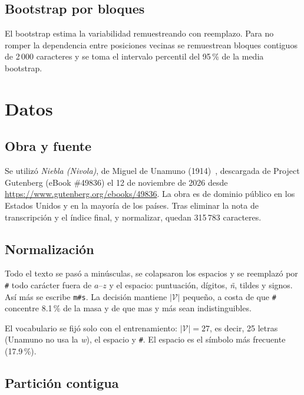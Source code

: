 \documentclass[11pt,letterpaper]{article}
\begin{document}
\subsection{Bootstrap por bloques}

El bootstrap estima la variabilidad remuestreando con reemplazo. Para no romper la dependencia entre posiciones vecinas se remuestrean bloques contiguos de 2\,000 caracteres y se toma el intervalo percentil del 95\,\% de la media bootstrap.

\section{Datos}\label{sec:datos}

\subsection{Obra y fuente}

Se utilizó \emph{Niebla (Nivola)}, de Miguel de Unamuno (1914)~\cite{unamuno}, descargada de Project Gutenberg (eBook \#49836) el 12 de noviembre de 2026 desde \url{https://www.gutenberg.org/ebooks/49836}. La obra es de dominio público en los Estados Unidos y en la mayoría de los países. Tras eliminar la nota de transcripción y el índice final, y normalizar, quedan 315\,783 caracteres.

\subsection{Normalización}

Todo el texto se pasó a minúsculas, se colapsaron los espacios y se reemplazó por \texttt{\#} todo carácter fuera de $a$--$z$ y el espacio: puntuación, dígitos, \emph{ñ}, tildes y signos. Así \guillemotleft{}más\guillemotright{} se escribe \texttt{m\#s}. La decisión mantiene $|\mathcal{V}|$ pequeño, a costa de que \texttt{\#} concentre 8.1\,\% de la masa y de que \guillemotleft{}mas\guillemotright{} y \guillemotleft{}más\guillemotright{} sean indistinguibles.

El vocabulario se fijó solo con el entrenamiento: $|\mathcal{V}|=27$, es decir, 25 letras (Unamuno no usa la \emph{w}), el espacio y \texttt{\#}. El espacio es el símbolo más frecuente (17.9\,\%).

\subsection{Partición contigua}
\end{document}
